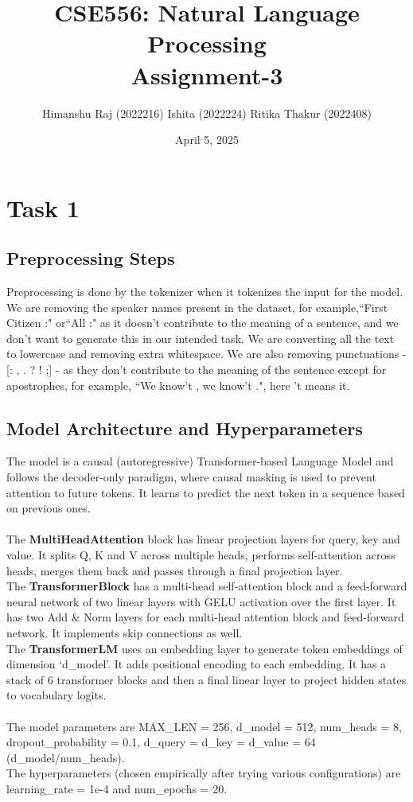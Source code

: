 \documentclass{article}
\title{CSE556: Natural Language Processing \\ Assignment-3}
\author{Himanshu Raj (2022216) \textbar{} Ishita (2022224) \textbar{} Ritika Thakur (2022408) }
\date{April 5, 2025}
\begin{document}
\maketitle

\section{Task 1}

\subsection{Preprocessing Steps}
Preprocessing is done by the tokenizer when it tokenizes the input for the model. We are removing the speaker names present in the dataset, for example,``First Citizen :" or``All :" as it doesn't contribute to the meaning of a sentence, and we don't want to generate this in our intended task. We are converting all the text to lowercase and removing extra whitespace. We are also removing punctuations - [: , . ? ! ;] - as they don't contribute to the meaning of the sentence except for apostrophes, for example, ``We know't , we know't .", here 't means it.

\subsection{Model Architecture and Hyperparameters}
The model is a causal (autoregressive) Transformer-based Language Model and follows the decoder-only paradigm, where causal masking is used to prevent attention to future tokens. It learns to predict the next token in a sequence based on previous ones.\\
\\
The \textbf{MultiHeadAttention} block has linear projection layers for query, key and value. It splits Q, K and V across multiple heads, performs self-attention across heads, merges them back and passes through a final projection layer.\\
The \textbf{TransformerBlock} has a multi-head self-attention block and a feed-forward neural network of two linear layers with GELU activation over the first layer. It has two Add \& Norm layers for each multi-head attention block and feed-forward network. It implements skip connections as well.\\
The \textbf{TransformerLM} uses an embedding layer to generate token embeddings of dimension `d\_model'. It adds positional encoding to each embedding. It has a stack of 6 transformer blocks and then a final linear layer to project hidden states to vocabulary logits.\\
\\
The model parameters are MAX\_LEN = 256, d\_model = 512, num\_heads = 8, dropout\_probability = 0.1, d\_query = d\_key = d\_value = 64 (d\_model/num\_heads).\\
The hyperparameters (chosen empirically after trying various configurations) are learning\_rate = 1e-4 and num\_epochs = 20.
\end{document}
